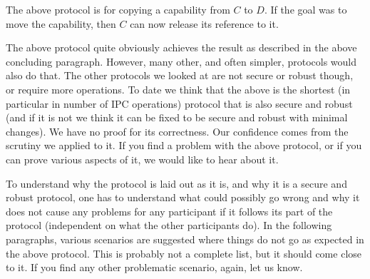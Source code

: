 The above protocol is for copying a capability from $C$ to $D$.  If
the goal was to move the capability, then $C$ can now release its
reference to it.

\begin{comment}
  Originally we considered to move capabilities by default, and
  require the client to acquire an additional reference if it wanted
  to copy it instead.  However, it turned out that for the
  implementation, copying is easier to handle.  One reason is that the
  client usually will use local reference counting for the
  capabilities it holds, and with local reference counting, one
  server-side reference is shared by many local references.  In that
  case, you would need to acquire a new server-side reference even if
  you want to move the capability.  The other reason is cancellation.
  If an RPC is cancelled, and you want to back out of it, you need to
  restore the original situation.  And that is easier if you do not
  change the original situation in the first place until the natural
  ``point of no return''.
\end{comment}

The above protocol quite obviously achieves the result as described in
the above concluding paragraph.  However, many other, and often
simpler, protocols would also do that.  The other protocols we looked
at are not secure or robust though, or require more operations.  To
date we think that the above is the shortest (in particular in number
of IPC operations) protocol that is also secure and robust (and if it
is not we think it can be fixed to be secure and robust with minimal
changes).  We have no proof for its correctness.  Our confidence comes
from the scrutiny we applied to it.  If you find a problem with the
above protocol, or if you can prove various aspects of it, we would
like to hear about it.

To understand why the protocol is laid out as it is, and why it is a
secure and robust protocol, one has to understand what could possibly
go wrong and why it does not cause any problems for any participant if
it follows its part of the protocol (independent on what the other
participants do).  In the following paragraphs, various scenarios are
suggested where things do not go as expected in the above protocol.
This is probably not a complete list, but it should come close to it.
If you find any other problematic scenario, again, let us know.

\begin{comment}
  Although some comments like this appear in the protocol description
  above, many comments have been spared for the following analysis of
  potential problems.  Read the analysis carefully, as it provides
  important information about how, and more importantly, why it works.
\end{comment}

